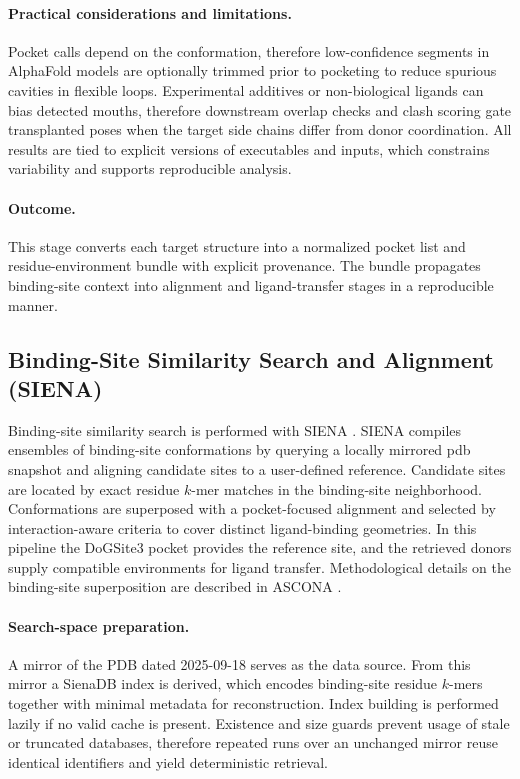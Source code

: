 \paragraph{Practical considerations and limitations.}
Pocket calls depend on the conformation, therefore low-confidence segments in AlphaFold models are optionally trimmed prior to pocketing to reduce spurious cavities in flexible loops. Experimental additives or non-biological ligands can bias detected mouths, therefore downstream overlap checks and clash scoring gate transplanted poses when the target side chains differ from donor coordination. All results are tied to explicit versions of executables and inputs, which constrains variability and supports reproducible analysis.

\paragraph{Outcome.}
This stage converts each target structure into a normalized pocket list and residue-environment bundle with explicit provenance. The bundle propagates binding-site context into alignment and ligand-transfer stages in a reproducible manner.

\subsection{Binding-Site Similarity Search and Alignment (SIENA)}\label{subsec:siena}
Binding-site similarity search is performed with SIENA \cite{bietzSIENAEfficientCompilation2016a}. SIENA compiles ensembles of binding-site conformations by querying a locally mirrored \gls{pdb} snapshot and aligning candidate sites to a user-defined reference. Candidate sites are located by exact residue $k$-mer matches in the binding-site neighborhood. Conformations are superposed with a pocket-focused alignment and selected by interaction-aware criteria to cover distinct ligand-binding geometries. In this pipeline the DoGSite3 pocket provides the reference site, and the retrieved donors supply compatible environments for ligand transfer. Methodological details on the binding-site superposition are described in ASCONA \cite{bietzASCONARapidDetection2015}.

\paragraph{Search-space preparation.}
A mirror of the PDB dated 2025-09-18 serves as the data source. From this mirror a SienaDB index is derived, which encodes binding-site residue $k$-mers together with minimal metadata for reconstruction. Index building is performed lazily if no valid cache is present. Existence and size guards prevent usage of stale or truncated databases, therefore repeated runs over an unchanged mirror reuse identical identifiers and yield deterministic retrieval.

